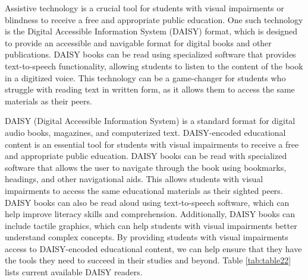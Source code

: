 \documentclass[12pt,letterpaper,twoside,openright]{report}
\begin{document}
Assistive technology is a crucial tool for students with visual impairments or blindness to receive a free and appropriate public education. One such technology is the Digital Accessible Information System (DAISY) format, which is designed to provide an accessible and navigable format for digital books and other publications. DAISY books can be read using specialized software that provides text-to-speech functionality, allowing students to listen to the content of the book in a digitized voice. This technology can be a game-changer for students who struggle with reading text in written form, as it allows them to access the same materials as their peers.

DAISY (Digital Accessible Information System) is a standard format for digital audio books, magazines, and computerized text. DAISY-encoded educational content is an essential tool for students with visual impairments to receive a free and appropriate public education. DAISY books can be read with specialized software that allows the user to navigate through the book using bookmarks, headings, and other navigational aids. This allows students with visual impairments to access the same educational materials as their sighted peers. DAISY books can also be read aloud using text-to-speech software, which can help improve literacy skills and comprehension. Additionally, DAISY books can include tactile graphics, which can help students with visual impairments better understand complex concepts. By providing students with visual impairments access to DAISY-encoded educational content, we can help ensure that they have the tools they need to succeed in their studies and beyond. Table \ref{tab:table22} lists current available DAISY readers.
\end{document}
